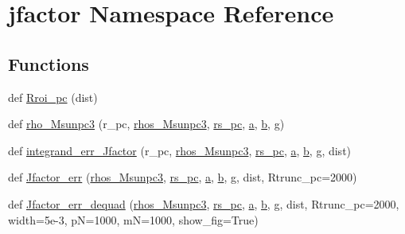 \hypertarget{namespacejfactor}{}\section{jfactor Namespace Reference}
\label{namespacejfactor}
\subsection*{Functions}
\begin{DoxyCompactItemize}
\item 
def \hyperlink{namespacejfactor_ae5aad7f2ac90b82740c027677d7f4ac7}{Rroi\+\_\+pc} (dist)
\item 
def \hyperlink{namespacejfactor_aa60ca47daf4f993e2cc8bd268f7b206d}{rho\+\_\+\+Msunpc3} (r\+\_\+pc, \hyperlink{namespacejfactor_aa9f6835eba853a5bb2b380ad7fb87010}{rhos\+\_\+\+Msunpc3}, \hyperlink{namespacejfactor_ae602db7ab45f472ad4007d04def859f7}{rs\+\_\+pc}, \hyperlink{namespacejfactor_ab5ce4a1ef962b5f938f157d0abc69a20}{a}, \hyperlink{namespacejfactor_a52f3e9e591dbe4f5d14f760a578cb15b}{b}, \hyperlink{namespacejfactor_a1e07b351e264fceb00b01b4a591e45e5}{g})
\item 
def \hyperlink{namespacejfactor_afb33d5b3499565b8b7c23e15f3615ec0}{integrand\+\_\+err\+\_\+\+Jfactor} (r\+\_\+pc, \hyperlink{namespacejfactor_aa9f6835eba853a5bb2b380ad7fb87010}{rhos\+\_\+\+Msunpc3}, \hyperlink{namespacejfactor_ae602db7ab45f472ad4007d04def859f7}{rs\+\_\+pc}, \hyperlink{namespacejfactor_ab5ce4a1ef962b5f938f157d0abc69a20}{a}, \hyperlink{namespacejfactor_a52f3e9e591dbe4f5d14f760a578cb15b}{b}, \hyperlink{namespacejfactor_a1e07b351e264fceb00b01b4a591e45e5}{g}, dist)
\item 
def \hyperlink{namespacejfactor_ad8b8ed7dec1d2c3b4432d37e53117f03}{Jfactor\+\_\+err} (\hyperlink{namespacejfactor_aa9f6835eba853a5bb2b380ad7fb87010}{rhos\+\_\+\+Msunpc3}, \hyperlink{namespacejfactor_ae602db7ab45f472ad4007d04def859f7}{rs\+\_\+pc}, \hyperlink{namespacejfactor_ab5ce4a1ef962b5f938f157d0abc69a20}{a}, \hyperlink{namespacejfactor_a52f3e9e591dbe4f5d14f760a578cb15b}{b}, \hyperlink{namespacejfactor_a1e07b351e264fceb00b01b4a591e45e5}{g}, dist, Rtrunc\+\_\+pc=2000)
\item 
def \hyperlink{namespacejfactor_a4d9eb98f6dca866cd6248ef6b1c308a5}{Jfactor\+\_\+err\+\_\+dequad} (\hyperlink{namespacejfactor_aa9f6835eba853a5bb2b380ad7fb87010}{rhos\+\_\+\+Msunpc3}, \hyperlink{namespacejfactor_ae602db7ab45f472ad4007d04def859f7}{rs\+\_\+pc}, \hyperlink{namespacejfactor_ab5ce4a1ef962b5f938f157d0abc69a20}{a}, \hyperlink{namespacejfactor_a52f3e9e591dbe4f5d14f760a578cb15b}{b}, \hyperlink{namespacejfactor_a1e07b351e264fceb00b01b4a591e45e5}{g}, dist, Rtrunc\+\_\+pc=2000, width=5e-\/3, p\+N=1000, m\+N=1000, show\+\_\+fig=\+True)

\end{DoxyCompactItemize}
